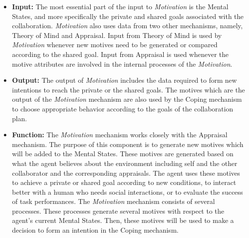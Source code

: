 \documentclass[12pt]{report}
\begin{document}
\begin{itemize}
  \item \textbf{Input:} The most essential part of the input to
  \textit{Motivation} is the Mental States, and more specifically the private
  and shared goals associated with the collaboration. \textit{Motivation} also
  uses data from two other mechanisms, namely, Theory of Mind and Appraisal.
  Input from Theory of Mind is used by \textit{Motivation} whenever new motives
  need to be generated or compared according to the shared goal. Input from
  Appraisal is used whenever the motive attributes are involved in the internal
  processes of the \textit{Motivation}.
  
  \item \textbf{Output:} The output of \textit{Motivation} includes the data
  required to form new intentions to reach the private or the shared goals.
  The motives which are the output of the \textit{Motivation} mechanism
  are also used by the Coping mechanism to choose appropriate behavior according
  to the goals of the collaboration plan.
  
  \item \textbf{Function:} The \textit{Motivation} mechanism works closely  
  with the Appraisal mechanism. The purpose of this component is to generate new
  motives which will be added to the Mental States. These motives are generated
  based on what the agent believes about the environment including self and the
  other collaborator and the corresponding appraisals. The agent uses these
  motives to achieve a private or shared goal according to new conditions, to
  interact better with a human who needs social interactions, or to evaluate the
  success of task performances. The \textit{Motivation} mechanism consists of
  several processes. These processes generate several motives with respect to
  the agent's current Mental States. Then, these motives will be used to make a
  decision to form an intention in the Coping mechanism.
\end{itemize}
\end{document}
